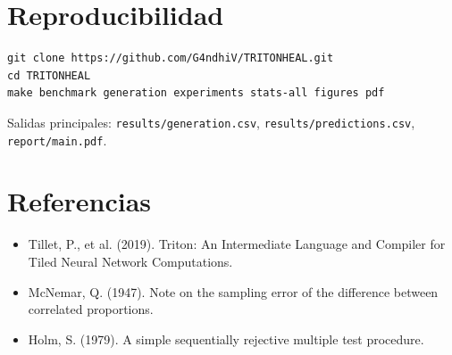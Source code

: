 \documentclass[11pt,a4paper]{article}
\begin{document}
\section{Reproducibilidad}

\begin{verbatim}
git clone https://github.com/G4ndhiV/TRITONHEAL.git
cd TRITONHEAL
make benchmark generation experiments stats-all figures pdf
\end{verbatim}

Salidas principales: \texttt{results/generation.csv}, \texttt{results/predictions.csv}, \texttt{report/main.pdf}.

\section{Referencias}

\begin{itemize}
  \item Tillet, P., et al. (2019). Triton: An Intermediate Language and Compiler for Tiled Neural Network Computations.
  \item McNemar, Q. (1947). Note on the sampling error of the difference between correlated proportions.
  \item Holm, S. (1979). A simple sequentially rejective multiple test procedure.
\end{itemize}
\end{document}
